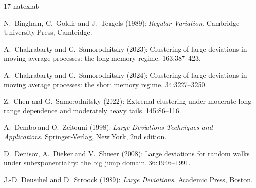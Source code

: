 \documentclass[11pt,reqno]{amsart}
\numberwithin{equation}{section}
\theoremstyle{definition}
\theoremstyle{remark}
\theoremstyle{definition}
\begin{document}
% 




%
%


 \begin{thebibliography}{17}
\expandafter\ifx\csname natexlab\endcsname\relax\def\natexlab#1{#1}\fi

{\sc N.~Bingham, C.~Goldie {\rm and} J.~Teugels} (1989): {\em Regular
  Variation\/}.
\newblock Cambridge University Press, Cambridge.

{\sc A.~Chakrabarty {\rm and} G.~Samorodnitsky} (2023): Clustering of large
  deviations in moving average processes: the long memory regime.
 163:387--423.

{\sc A.~Chakrabarty {\rm and} G.~Samorodnitsky} (2024): Clustering of large
  deviations in moving average processes: the short memory regime.
 34:3227--3250.

{\sc Z.~Chen {\rm and} G.~Samorodnitsky} (2022): Extremal clustering under
  moderate long range dependence and moderately heavy tails.
 145:86--116.

{\sc A.~Dembo {\rm and} O.~Zeitouni} (1998): {\em Large Deviations Techniques
  and Applications\/}.
\newblock Springer-Verlag, New York, 2nd edition.

{\sc D.~Denisov, A.~Dieker {\rm and} V.~Shneer} (2008): Large deviations for
  random walks under subexponentiality: the big jump domain.
 36:1946--1991.

{\sc J.-D. Deuschel {\rm and} D.~Stroock} (1989): {\em Large Deviations\/}.
\newblock Academic Press, Boston.


\end{thebibliography}
\end{document}
